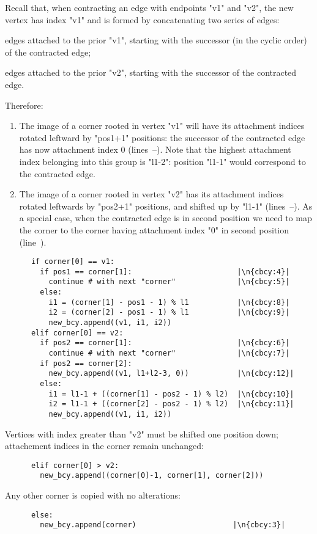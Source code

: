 Recall that, when contracting an edge with endpoints "v1" and "v2",
the new vertex has index "v1" and is formed by concatenating two
series of edges:
\begin{inparaenum}
\item edges attached to the prior "v1", starting with the successor
  (in the cyclic order) of the contracted edge;
\item edges attached to the prior "v2", starting with the successor
  of the contracted edge.
\end{inparaenum}
Therefore:
\begin{enumerate}
\item The image of a corner rooted in vertex "v1" will have its
  attachment indices rotated leftward by "pos1+1" positions: the
  successor of the contracted edge has now attachment index 0
  (lines~--).  Note that the highest attachment
  index belonging into this group is "l1-2": position "l1-1" would
  correspond to the contracted edge.
\item The image of a corner rooted in vertex "v2" has its attachment
  indices rotated leftwards by "pos2+1" positions, and shifted up by
  "l1-1" (lines~--).  As a special case, when
  the contracted edge is in second position we need to map the corner
  to the corner having attachment index "0" in second position
  (line~).
\end{enumerate}
\begin{lstlisting}
      if corner[0] == v1:
        if pos1 == corner[1]:                        |\n{cbcy:4}|
          continue # with next "corner"              |\n{cbcy:5}|
        else: 
          i1 = (corner[1] - pos1 - 1) % l1           |\n{cbcy:8}|
          i2 = (corner[2] - pos1 - 1) % l1           |\n{cbcy:9}|
          new_bcy.append((v1, i1, i2))
      elif corner[0] == v2:
        if pos2 == corner[1]:                        |\n{cbcy:6}|
          continue # with next "corner"              |\n{cbcy:7}|
        if pos2 == corner[2]:
          new_bcy.append((v1, l1+l2-3, 0))           |\n{cbcy:12}|
        else:
          i1 = l1-1 + ((corner[1] - pos2 - 1) % l2)  |\n{cbcy:10}|
          i2 = l1-1 + ((corner[2] - pos2 - 1) % l2)  |\n{cbcy:11}|
          new_bcy.append((v1, i1, i2))
\end{lstlisting}
Vertices with index greater than "v2" must be shifted one position
down; attachement indices in the corner remain unchanged:
\begin{lstlisting}
      elif corner[0] > v2:
        new_bcy.append((corner[0]-1, corner[1], corner[2]))
\end{lstlisting}
Any other corner is copied with no alterations:
\begin{lstlisting}
      else:
        new_bcy.append(corner)                      |\n{cbcy:3}|
\end{lstlisting}

